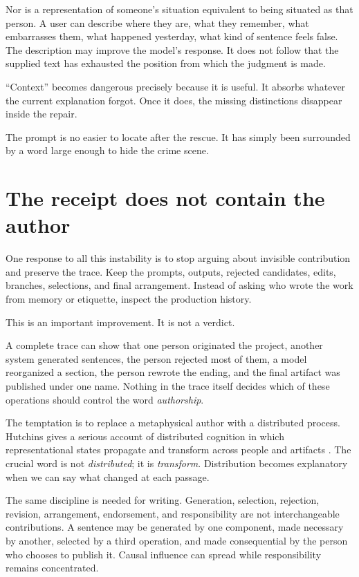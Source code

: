 \documentclass[11pt]{article}
\begin{document}
Nor is a representation of someone's situation equivalent to being situated as that person. A user can describe where they are, what they remember, what embarrasses them, what happened yesterday, what kind of sentence feels false. The description may improve the model's response. It does not follow that the supplied text has exhausted the position from which the judgment is made.

``Context'' becomes dangerous precisely because it is useful. It absorbs whatever the current explanation forgot. Once it does, the missing distinctions disappear inside the repair.

The prompt is no easier to locate after the rescue. It has simply been surrounded by a word large enough to hide the crime scene.

\section{The receipt does not contain the author}

One response to all this instability is to stop arguing about invisible contribution and preserve the trace. Keep the prompts, outputs, rejected candidates, edits, branches, selections, and final arrangement. Instead of asking who wrote the work from memory or etiquette, inspect the production history.

This is an important improvement. It is not a verdict.

A complete trace can show that one person originated the project, another system generated sentences, the person rejected most of them, a model reorganized a section, the person rewrote the ending, and the final artifact was published under one name. Nothing in the trace itself decides which of these operations should control the word \emph{authorship}.

The temptation is to replace a metaphysical author with a distributed process. Hutchins gives a serious account of distributed cognition in which representational states propagate and transform across people and artifacts \parencite{hutchins1995cognition}. The crucial word is not \emph{distributed}; it is \emph{transform}. Distribution becomes explanatory when we can say what changed at each passage.

The same discipline is needed for writing. Generation, selection, rejection, revision, arrangement, endorsement, and responsibility are not interchangeable contributions. A sentence may be generated by one component, made necessary by another, selected by a third operation, and made consequential by the person who chooses to publish it. Causal influence can spread while responsibility remains concentrated.
\end{document}

